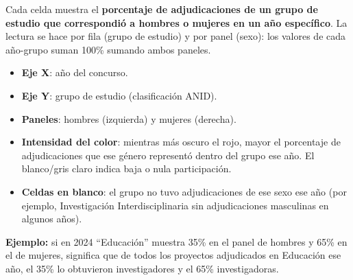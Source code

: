 \documentclass[
  spanish,
  a4paper,
  oneside]{scrbook}
\providecommand{\tightlist}{%
  \setlength{\itemsep}{0pt}\setlength{\parskip}{0pt}}
\begin{document}
\begin{tcolorbox}[enhanced jigsaw, colbacktitle=quarto-callout-tip-color!10!white, opacityback=0, opacitybacktitle=0.6, rightrule=.15mm, breakable, toprule=.15mm, coltitle=black, colframe=quarto-callout-tip-color-frame, toptitle=1mm, bottomtitle=1mm, titlerule=0mm, title=\textcolor{quarto-callout-tip-color}{\faLightbulb}\hspace{0.5em}{Cómo leer el gráfico heatmap}, arc=.35mm, bottomrule=.15mm, colback=white, leftrule=.75mm, left=2mm]

Cada celda muestra el \textbf{porcentaje de adjudicaciones de un grupo
de estudio que correspondió a hombres o mujeres en un año específico}.
La lectura se hace por fila (grupo de estudio) y por panel (sexo): los
valores de cada año-grupo suman 100\% sumando ambos paneles.

\begin{itemize}
\tightlist
\item
  \textbf{Eje X}: año del concurso.
\item
  \textbf{Eje Y}: grupo de estudio (clasificación ANID).
\item
  \textbf{Paneles}: hombres (izquierda) y mujeres (derecha).
\item
  \textbf{Intensidad del color}: mientras más oscuro el rojo, mayor el
  porcentaje de adjudicaciones que ese género representó dentro del
  grupo ese año. El blanco/gris claro indica baja o nula participación.
\item
  \textbf{Celdas en blanco}: el grupo no tuvo adjudicaciones de ese sexo
  ese año (por ejemplo, Investigación Interdisciplinaria sin
  adjudicaciones masculinas en algunos años).
\end{itemize}

\textbf{Ejemplo:} si en 2024 ``Educación'' muestra 35\% en el panel de
hombres y 65\% en el de mujeres, significa que de todos los proyectos
adjudicados en Educación ese año, el 35\% lo obtuvieron investigadores y
el 65\% investigadoras.

\end{tcolorbox}
\end{document}
